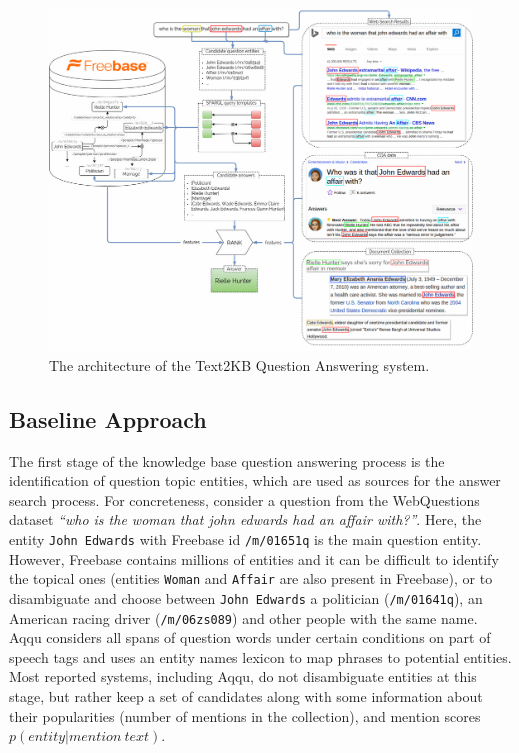 \begin{figure}[t]
\centering
\includegraphics[width=\textwidth]{img/text2kb_model}
\caption{The architecture of the Text2KB Question Answering system.}
\label{figure:factoid:text2kb:model}
\end{figure}

\subsection{Baseline Approach}
\label{section:factoid:text2kb:baseline}

The first stage of the knowledge base question answering process is the identification of question topic entities, which are used as sources for the answer search process.
For concreteness, consider a question from the WebQuestions dataset \textit{``who is the woman that john edwards had an affair with?''}.
Here, the entity \texttt{John Edwards} with Freebase id \texttt{/m/01651q} is the main question entity.
However, Freebase contains millions of entities and it can be difficult to identify the topical ones (\eg entities \texttt{Woman} and \texttt{Affair} are also present in Freebase), or to disambiguate and choose between \texttt{John Edwards} a politician (\texttt{/m/01641q}), an American racing driver (\texttt{/m/06zs089}) and other people with the same name.
Aqqu considers all spans of question words under certain conditions on part of speech tags and uses an entity names lexicon \cite{SPITKOVSKY12.266} to map phrases to potential entities.
Most reported systems, including Aqqu, do not disambiguate entities at this stage, but rather keep a set of candidates along with some information about their popularities (\eg number of mentions in the collection), and mention scores $p(entity| mention\ text)$.

